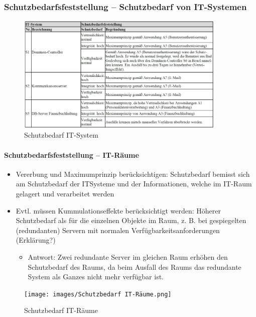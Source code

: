 \documentclass[10pt,a4paper]{article}
\begin{document}
\subsubsection*{Schutzbedarfsfeststellung – Schutzbedarf von IT-Systemen}
\begin{figure}[H]
    \begin{center}
    \includegraphics[width=10cm]{images/Schutzbedarf IT-System.png}
    \caption{Schutzbedarf IT-System}
    \label{Schutzbedarf IT-System}
    \end{center}
\end{figure}

\paragraph*{Schutzbedarfsfeststellung – IT-Räume}
\begin{itemize}[noitemsep,topsep=0pt,leftmargin=*]
    \item Vererbung und Maximumprinzip berücksichtigen:
    Schutzbedarf bemisst sich am Schutzbedarf der ITSysteme und der Informationen, welche im IT-Raum
    gelagert und verarbeitet werden
    \item Evtl. müssen Kummulationseffekte berücksichtigt
    werden: Höherer Schutzbedarf als für die einzelnen
    Objekte im Raum, z. B. bei gespiegelten
    (redundanten) Servern mit normalen
    Verfügbarkeitsanforderungen (Erklärung?)
    \begin{itemize}[noitemsep,topsep=0pt,leftmargin=*]
        \item Antwort: Zwei redundante Server im gleichen Raum erhöhen den Schutzbedarf des Raums, da beim Ausfall des Raums das redundante System als Ganzes nicht mehr verfügbar ist.
    \end{itemize}
\end{itemize}

\begin{figure}[H]
    \begin{center}
    \texttt{[image: images/Schutzbedarf IT-Räume.png]}
    \caption{Schutzbedarf IT-Räume}
    \label{Schutzbedarf IT-Räume}
    \end{center}
\end{figure}
\end{document}
